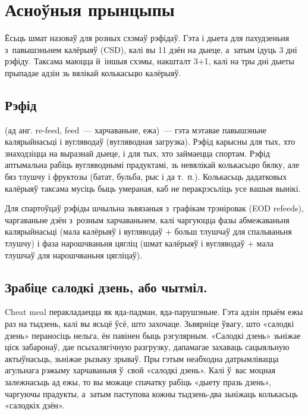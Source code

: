 \section{Асноўныя прынцыпы}

Ёсьць шмат назоваў для розных схэмаў рэфідаў. Гэта і дыета для пахудзеньня з~павышэньнем калёрыяў (CSD), калі вы 11 дзён на дыеце, а~затым ідуць 3 дні рэфіду. Таксама маюцца й~іншыя схэмы, накшталт 3+1, калі на тры дні дыеты прыпадае адзін зь вялікай колькасьцю калёрыяў.

\subsection{Рэфід} (ад анг. re-feed, feed~--- харчаваньне, ежа)~--- гэта мэтавае павышэньне калярыйнасьці і вугляводаў (вугляводная загрузка). Рэфід карысны для тых, хто знаходзіцца на выразнай дыеце, і для тых, хто займаецца спортам. Рэфід аптымальна рабіць вугляводнымі прадуктамі, зь невялікай колькасьцю бялку, але бяз тлушчу і фруктозы (батат, бульба, рыс і да т.~п.). Колькасьць дадатковых калёрыяў таксама мусіць быць умераная, каб не перакрэсьліць усе вашыя вынікі.

Для спартоўцаў рэфіды шчыльна зьвязаныя з~графікам трэніровак (EOD refeeds), чаргаваньне дзён з~розным харчаваньнем, калі чаргуюцца фазы абмежаваньня калярыйнасьці (мала калёрыяў і вугляводаў + больш тлушчаў для спальваньня тлушчу) і фаза нарошчваньня цягліц (шмат калёрыяў і вугляводаў + мала тлушчаў для нарошчваньня цягліцаў).


\subsection{Зрабіце салодкі дзень, або чытміл.}
Cheat meal перакладаецца як яда-падман, яда-парушэньне. Гэта адзін прыём ежы раз на тыдзень, калі вы ясьцё ўсё, што захочаце. Зьвярніце ўвагу, што «салодкі дзень» пераносіць нельга, ён павінен быць рэгулярным. «Салодкі дзень» зьніжае ціск забаронаў, дае псыхалягічную разгрузку, дапамагае захаваць сацыяльную актыўнасьць, зьніжае рызыку зрываў. Пры гэтым неабходна датрымлівацца агульнага рэжыму харчаваньня ў~свой «салодкі дзень». Калі ў~вас моцная залежнасьць ад ежы, то вы можаце спачатку рабіць «дыету празь дзень», чаргуючы прадукты, а~затым паступова кожны тыдзень-два зьніжаць колькасьць «салодкіх дзён».

